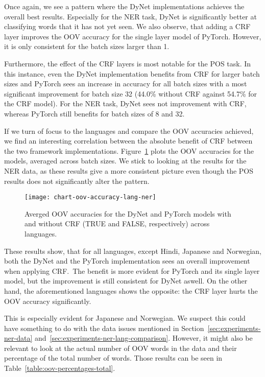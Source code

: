Once again, we see a pattern where the DyNet implementations achieves the
overall best results. Especially for the NER task, DyNet is significantly
better at classifying words that it has not yet seen. We also observe, that
adding a CRF layer improves the OOV accuracy for the single layer model of
PyTorch. However, it is only consistent for the batch sizes larger than 1.

Furthermore, the effect of the CRF layers is most notable for the POS task.
In this instance, even the DyNet implementation benefits from CRF for larger
batch sizes and PyTorch sees an increase in accuracy for all batch sizes with a
most significant improvement for batch size 32 (44.0\% without CRF against
54.7\% for the CRF model). For the NER task, DyNet sees not improvement with
CRF, whereas PyTorch still benefits for batch sizes of 8 and 32.

If we turn of focus to the languages and compare the OOV accuracies achieved, we
find an interesting correlation between the absolute benefit of CRF between the
two framework implementations. Figure~\ref{chart:oov-accuracy-lang-ner} plots
the OOV accuracies for the models, averaged across batch sizes. We stick to
looking at the results for the NER data, as these results give a more consistent
picture even though the POS results does not significantly alter the pattern.

\begin{figure}[h!]
    \texttt{[image: chart-oov-accuracy-lang-ner]}
    \caption{Averged OOV accuracies for the DyNet and PyTorch models with and
        without CRF (TRUE and FALSE, respectively) across languages.
    }\label{chart:oov-accuracy-lang-ner}
\end{figure}

These results show, that for all languages, except Hindi, Japanese and
Norwegian, both the DyNet and the PyTorch implementation sees an overall
improvement when applying CRF.\ The benefit is more evident for PyTorch and its
single layer model, but the improvement is still consistent for DyNet aswell. On
the other hand, the aforementioned languages shows the opposite: the CRF layer
hurts the OOV accuracy significantly.

This is especially evident for Japanese and Norwegian. We suspect this could
have something to do with the data issues mentioned in
Section~\ref{sec:experiments-ner-data}
and~\ref{sec:experiments-ner-lang-comparison}. However, it might also be
relevant to look at the actual number of OOV words in the data and their
percentage of the total number of words. Those results can be seen in
Table~\ref{table:oov-percentages-total}.

